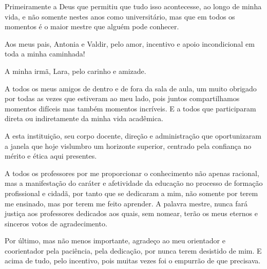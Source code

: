 Primeiramente a Deus que permitiu que tudo isso acontecesse, ao longo de minha vida, e não somente nestes anos como universitário, mas que em todos os momentos é o maior mestre que alguém pode conhecer.

Aos meus pais, Antonia e Valdir, pelo amor, incentivo e apoio incondicional em toda a minha caminhada!

A minha irmã, Lara, pelo carinho e amizade.

A todos os meus amigos de dentro e de fora da sala de aula, um muito obrigado por todas as vezes que estiveram ao meu lado, pois juntos compartilhamos momentos difíceis mas também momentos incríveis. E a todos que participaram direta ou indiretamente da minha vida acadêmica.

A esta instituição, seu corpo docente, direção e administração que oportunizaram a janela que hoje vislumbro um horizonte superior, centrado pela confiança no mérito e ética aqui presentes.

A todos os professores por me proporcionar o conhecimento não apenas racional, mas a manifestação do caráter e afetividade da educação no processo de formação profissional e cidadã, por tanto que se dedicaram a mim, não somente por terem me ensinado, mas por terem me feito aprender. A palavra mestre, nunca fará justiça aos professores dedicados aos quais, sem nomear, terão os meus eternos e sinceros votos de agradecimento.

Por último, mas não menos importante, agradeço ao meu orientador e coorientador pela paciência, pela dedicação, por nunca terem desistido de mim. E acima de tudo, pelo incentivo, pois muitas vezes foi o empurrão de que precisava.